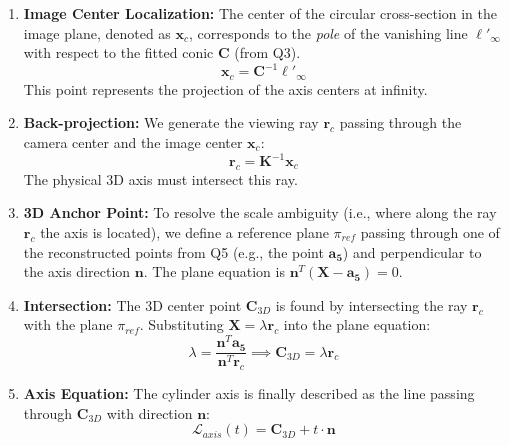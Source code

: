 \documentclass[a4paper,11pt]{article}
\newcommand{\matr}[1]{\bm{#1}}     %
\newcommand{\vect}[1]{\mathbf{#1}}  %
\begin{document}
\begin{enumerate}
    \item \textbf{Image Center Localization:} The center of the circular cross-section in the image plane, denoted as $\vect{x}_c$, corresponds to the \textit{pole} of the vanishing line $\ell'_\infty$ with respect to the fitted conic $\matr{C}$ (from Q3). 
    \begin{equation}
        \vect{x}_c = \matr{C}^{-1} \ell'_\infty
    \end{equation}
    This point represents the projection of the axis centers at infinity.
    
    \item \textbf{Back-projection:} We generate the viewing ray $\vect{r}_c$ passing through the camera center and the image center $\vect{x}_c$:
    \begin{equation}
        \vect{r}_c = \matr{K}^{-1} \vect{x}_c
    \end{equation}
    The physical 3D axis must intersect this ray.
    
    \item \textbf{3D Anchor Point:} To resolve the scale ambiguity (i.e., where along the ray $\vect{r}_c$ the axis is located), we define a reference plane $\pi_{ref}$ passing through one of the reconstructed points from Q5 (e.g., the point $\vect{a_5}$) and perpendicular to the axis direction $\vect{n}$. The plane equation is $\vect{n}^T (\vect{X} - \vect{a_5}) = 0$.
    
    \item \textbf{Intersection:} The 3D center point $\vect{C}_{3D}$ is found by intersecting the ray $\vect{r}_c$ with the plane $\pi_{ref}$. Substituting $\vect{X} = \lambda \vect{r}_c$ into the plane equation:
    \begin{equation}
        \lambda = \frac{\vect{n}^T \vect{a_5}}{\vect{n}^T \vect{r}_c} \implies \vect{C}_{3D} = \lambda \vect{r}_c
    \end{equation}
    
    \item \textbf{Axis Equation:} The cylinder axis is finally described as the line passing through $\vect{C}_{3D}$ with direction $\vect{n}$:
    \begin{equation}
        \mathcal{L}_{axis}(t) = \vect{C}_{3D} + t \cdot \vect{n}
    \end{equation}
\end{enumerate}
\end{document}
